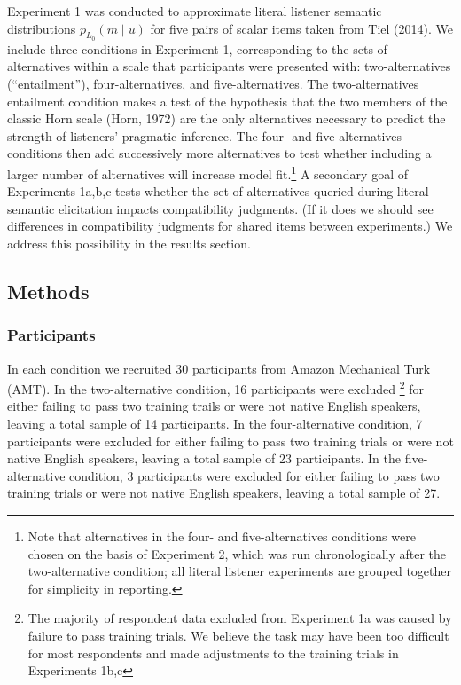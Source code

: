 \documentclass[10pt, letterpaper]{article}
\begin{document}
Experiment 1 was conducted to approximate literal listener semantic
distributions \(p_{L_0}(m \mid u)\) for five pairs of scalar items taken
from Tiel (2014). We include three conditions in Experiment 1,
corresponding to the sets of alternatives within a scale that
participants were presented with: two-alternatives (``entailment''),
four-alternatives, and five-alternatives. The two-alternatives
entailment condition makes a test of the hypothesis that the two members
of the classic Horn scale (Horn, 1972) are the only alternatives
necessary to predict the strength of listeners' pragmatic inference. The
four- and five-alternatives conditions then add successively more
alternatives to test whether including a larger number of alternatives
will increase model
fit.\footnote{Note that alternatives in the four- and five-alternatives conditions were chosen on the basis of Experiment 2, which was run chronologically after the two-alternative condition; all literal listener experiments are grouped together for simplicity in reporting.}
A secondary goal of Experiments 1a,b,c tests whether the set of
alternatives queried during literal semantic elicitation impacts
compatibility judgments. (If it does we should see differences in
compatibility judgments for shared items between experiments.) We
address this possibility in the results section.

\subsection{Methods}\label{methods}

\subsubsection{Participants}\label{participants}

In each condition we recruited 30 participants from Amazon Mechanical
Turk (AMT). In the two-alternative condition, 16 participants were
excluded
\footnote{The majority of respondent data excluded from Experiment 1a was caused by failure to pass training trials. We believe the task may have been too difficult for most respondents and made adjustments to the training trials in Experiments 1b,c}
for either failing to pass two training trails or were not native
English speakers, leaving a total sample of 14 participants. In the
four-alternative condition, 7 participants were excluded for either
failing to pass two training trials or were not native English speakers,
leaving a total sample of 23 participants. In the five-alternative
condition, 3 participants were excluded for either failing to pass two
training trials or were not native English speakers, leaving a total
sample of 27.
\end{document}
